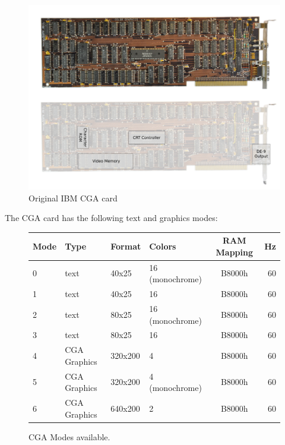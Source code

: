 \documentclass[book.tex]{subfiles}
\begin{document}
\begin{figure}[H]
  \centering 
  \includegraphics[width=1.3\textwidth, angle =90 ]{screenshots_300dpi/hardware/ibm_cga_card.png} 
  \caption{Original IBM CGA card}
  \label{fig:ibm_cga_card}
\end{figure}

The CGA card has the following text and graphics modes:\\
\vspace{-15pt}
\begin{figure}[H]
\centering
\begin{table}[H]
\begin{tabularx}{\textwidth}[c]{llllcr}
\hline
\textbf{Mode} & \textbf{Type} & \textbf{Format} & \textbf{Colors} & \hspace{10pt}\textbf{RAM Mapping}\hspace{10pt} & \textbf{Hz}        \\ \hline
0             & text          & 40x25           & 16 (monochrome) & B8000h     & 60                           \\ \hline
1             & text          & 40x25           & 16              & B8000h    & 60                            \\ \hline
2             & text          & 80x25           & 16 (monochrome) & B8000h    & 60                            \\ \hline
3             & text          & 80x25           & 16              & B8000h    & 60                            \\ \hline
4             & CGA Graphics  & 320x200         & 4               & B8000h    & 60                            \\ \hline
5             & CGA Graphics  & 320x200         & 4 (monochrome)  & B8000h    & 60                            \\ \hline
6             & CGA Graphics  & 640x200         & 2               & B8000h    & 60                            \\ \hline

\end{tabularx}
\end{table}
\caption{CGA Modes available.}
\label{ega-modes-available}
 \end{figure} 
\end{document}
